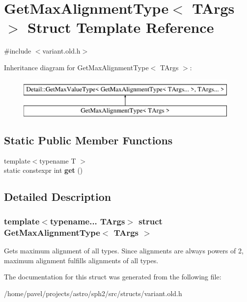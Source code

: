 \hypertarget{structGetMaxAlignmentType}{}\section{Get\+Max\+Alignment\+Type$<$ T\+Args $>$ Struct Template Reference}
\label{structGetMaxAlignmentType}


{\ttfamily \#include $<$variant.\+old.\+h$>$}

Inheritance diagram for Get\+Max\+Alignment\+Type$<$ T\+Args $>$\+:\begin{figure}[H]
\begin{center}
\leavevmode
\includegraphics[height=2.000000cm]{structGetMaxAlignmentType}
\end{center}
\end{figure}
\subsection*{Static Public Member Functions}
\begin{DoxyCompactItemize}
\item 
\hypertarget{structGetMaxAlignmentType_a76eef930ca8b3e83a780881c578ec872}{}\label{structGetMaxAlignmentType_a76eef930ca8b3e83a780881c578ec872} 
{\footnotesize template$<$typename T $>$ }\\static constexpr int {\bfseries get} ()
\end{DoxyCompactItemize}


\subsection{Detailed Description}
\subsubsection*{template$<$typename... T\+Args$>$\newline
struct Get\+Max\+Alignment\+Type$<$ T\+Args $>$}

Gets maximum alignment of all types. Since alignments are always powers of 2, maximum alignment fulfills alignments of all types. 

The documentation for this struct was generated from the following file\+:\begin{DoxyCompactItemize}
\item 
/home/pavel/projects/astro/sph2/src/structs/variant.\+old.\+h\end{DoxyCompactItemize}

